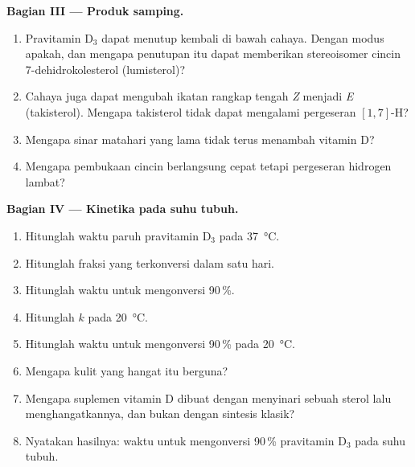\begin{problem}
\medskip\noindent\textbf{Bagian III --- Produk samping.}
\begin{enumerate}[resume, beginpenalty=10000]
  \item Pravitamin D$_3$ dapat menutup kembali di bawah cahaya. Dengan modus apakah, dan mengapa penutupan itu dapat memberikan
        stereoisomer cincin 7-dehidrokolesterol (lumisterol)?
  \item Cahaya juga dapat mengubah ikatan rangkap tengah \textit{Z} menjadi \textit{E} (takisterol). Mengapa
        takisterol tidak dapat mengalami pergeseran $[1,7]$-H?
  \item Mengapa sinar matahari yang lama tidak terus menambah vitamin D?
  \item Mengapa pembukaan cincin berlangsung cepat tetapi pergeseran hidrogen lambat?
\end{enumerate}

\medskip\noindent\textbf{Bagian IV --- Kinetika pada suhu tubuh.}
\begin{enumerate}[resume, beginpenalty=10000]
  \item Hitunglah waktu paruh pravitamin D$_3$ pada \qty{37}{\celsius}.
  \item Hitunglah fraksi yang terkonversi dalam satu hari.
  \item Hitunglah waktu untuk mengonversi 90\,\%.
  \item Hitunglah $k$ pada \qty{20}{\celsius}.
  \item Hitunglah waktu untuk mengonversi 90\,\% pada \qty{20}{\celsius}.
  \item Mengapa kulit yang hangat itu berguna?
  \item Mengapa suplemen vitamin D dibuat dengan menyinari sebuah sterol lalu menghangatkannya,
        dan bukan dengan sintesis klasik?
  \item Nyatakan hasilnya: waktu untuk mengonversi 90\,\% pravitamin D$_3$ pada suhu tubuh.
\end{enumerate}
\end{problem}
